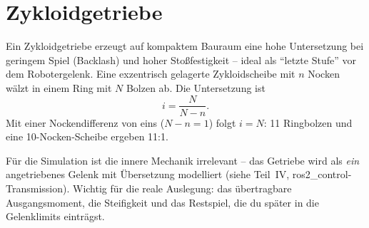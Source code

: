 
\chapter{Zykloidgetriebe}

Ein Zykloidgetriebe erzeugt auf kompaktem Bauraum eine hohe Untersetzung bei
geringem Spiel (Backlash) und hoher Stoßfestigkeit -- ideal als ``letzte
Stufe'' vor dem Robotergelenk. Eine exzentrisch gelagerte Zykloidscheibe mit
$n$ Nocken wälzt in einem Ring mit $N$ Bolzen ab. Die Untersetzung ist
\begin{equation}
i = \frac{N}{N - n}.
\end{equation}
Mit einer Nockendifferenz von eins ($N - n = 1$) folgt $i = N$: 11 Ringbolzen
und eine 10-Nocken-Scheibe ergeben 11:1.

Für die Simulation ist die innere Mechanik irrelevant -- das Getriebe wird als
\emph{ein} angetriebenes Gelenk mit Übersetzung modelliert (siehe
Teil~IV, ros2\_control-Transmission). Wichtig für die reale Auslegung: das
übertragbare Ausgangsmoment, die Steifigkeit und das Restspiel, die du später
in die Gelenklimits einträgst.
